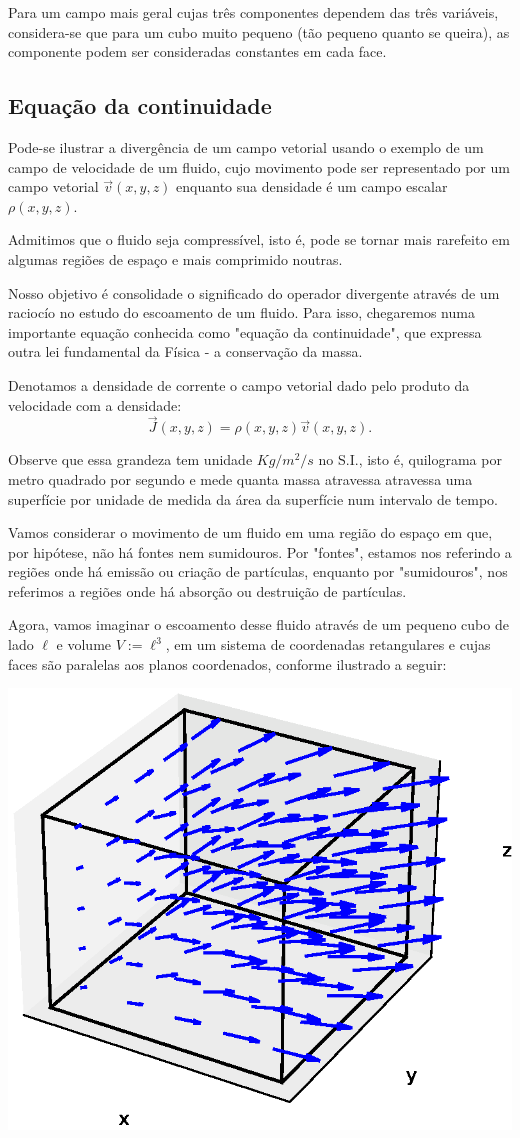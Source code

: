 Para um campo mais geral cujas três componentes dependem das três variáveis, considera-se que para um cubo muito pequeno (tão pequeno quanto se queira), as componente podem ser consideradas constantes em cada face.


\subsection{Equação da continuidade}
Pode-se ilustrar a divergência de um campo vetorial usando o exemplo de um campo de velocidade de um fluido, cujo movimento pode ser representado por um campo vetorial $\vec{v}(x, y, z)$ enquanto sua densidade é um campo escalar $\rho(x, y, z)$.

Admitimos que o fluido seja compressível, isto é, pode se tornar mais rarefeito em algumas regiões de espaço e mais comprimido noutras.

Nosso objetivo é consolidade o significado do operador divergente através de um raciocío no estudo do escoamento de um fluido. Para isso, chegaremos numa importante equação conhecida como "equação da continuidade", que expressa outra lei fundamental da Física - a conservação da massa. 

Denotamos a densidade de corrente o campo vetorial dado pelo produto da velocidade com a densidade: 
$$\vec{J}(x, y, z) = \rho(x, y, z)\vec{v}(x, y, z).$$

Observe que essa grandeza tem unidade $Kg/m^2/s$ no S.I., isto é, quilograma por metro quadrado por segundo e mede quanta massa atravessa atravessa uma superfície por unidade de medida da área da superfície num intervalo de tempo.



Vamos considerar o movimento de um fluido em uma região do espaço em que, por hipótese, não há fontes nem sumidouros. Por "fontes", estamos nos referindo a regiões onde há emissão ou criação de partículas, enquanto por "sumidouros", nos referimos a regiões onde há absorção ou destruição de partículas.

Agora, vamos imaginar o escoamento desse fluido através de um pequeno cubo de lado $\ell$ e volume $V := \ell^3$, em um sistema de coordenadas retangulares e cujas faces são paralelas aos planos coordenados, conforme ilustrado a seguir:

\begin{center}\includegraphics[width=.5\textwidth]{cap_campos/figs/campo_com_cubo_divergente}\end{center}

